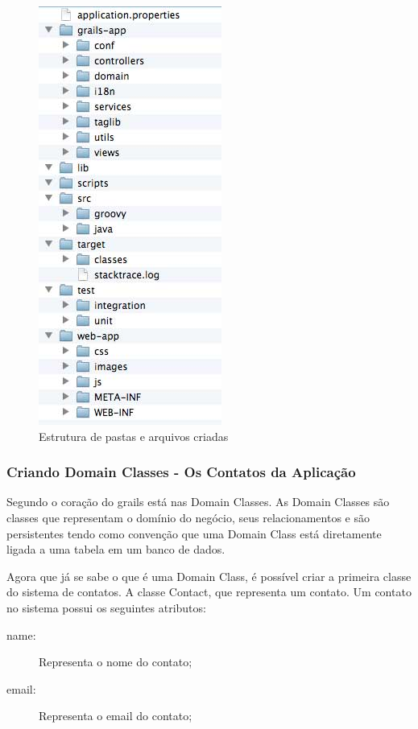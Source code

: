 \documentclass[12pt]{article}
\begin{document}
    \begin{figure}[h!]
    \centering
    \includegraphics[width=.4\textwidth]{images/appStructure.jpg}
    \caption{Estrutura de pastas e arquivos criadas}
    \label{fig:appStructure}
    \end{figure}

\subsubsection{Criando Domain Classes - Os Contatos da Aplicação}

    Segundo \cite{pragmaticGrails:2009} o coração do grails está nas Domain Classes.
    As Domain Classes são classes que representam o domínio do negócio, seus 
    relacionamentos e são persistentes tendo como convenção que uma Domain Class
    está diretamente ligada a uma tabela em um banco de dados.
    
    Agora que já se sabe o que é uma Domain Class, é possível criar a primeira
    classe do sistema de contatos. A classe Contact, que representa um contato.
    Um contato no sistema possui os seguintes atributos:
    
    \begin{description}
        \item[name:] Representa o nome do contato;
        \item[email:] Representa o email do contato;
    \end{description}
    
\end{document}
